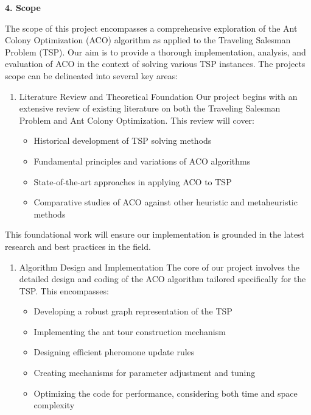 \documentclass[
]{article}
\begin{document}
\textbf{4. Scope}

The scope of this project encompasses a comprehensive exploration of the
Ant Colony Optimization (ACO) algorithm as applied to the Traveling
Salesman Problem (TSP). Our aim is to provide a thorough implementation,
analysis, and evaluation of ACO in the context of solving various TSP
instances. The project\textquotesingle s scope can be delineated into
several key areas:

\begin{enumerate}
\def\labelenumi{\arabic{enumi}.}
\item
  Literature Review and Theoretical Foundation Our project begins with
  an extensive review of existing literature on both the Traveling
  Salesman Problem and Ant Colony Optimization. This review will cover:

  \begin{itemize}
  \item
    Historical development of TSP solving methods
  \item
    Fundamental principles and variations of ACO algorithms
  \item
    State-of-the-art approaches in applying ACO to TSP
  \item
    Comparative studies of ACO against other heuristic and metaheuristic
    methods
  \end{itemize}
\end{enumerate}

This foundational work will ensure our implementation is grounded in the
latest research and best practices in the field.

\begin{enumerate}
\def\labelenumi{\arabic{enumi}.}
\setcounter{enumi}{1}
\item
  Algorithm Design and Implementation The core of our project involves
  the detailed design and coding of the ACO algorithm tailored
  specifically for the TSP. This encompasses:

  \begin{itemize}
  \item
    Developing a robust graph representation of the TSP
  \item
    Implementing the ant tour construction mechanism
  \item
    Designing efficient pheromone update rules
  \item
    Creating mechanisms for parameter adjustment and tuning
  \item
    Optimizing the code for performance, considering both time and space
    complexity
  \end{itemize}
\end{enumerate}
\end{document}
